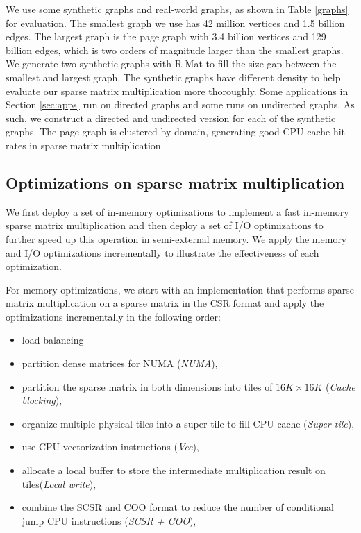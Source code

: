 We use some synthetic graphs and real-world graphs, as shown in Table \ref{graphs}
for evaluation. The smallest graph we use has 42 million vertices and 1.5 billion
edges. The largest graph is the page graph with 3.4 billion vertices
and 129 billion edges, which is two orders of magnitude larger than the smallest
graphs. We generate two synthetic graphs with R-Mat \cite{rmat} to fill
the size gap between the smallest and largest graph. The synthetic graphs
have different density to help evaluate our sparse matrix multiplication more
thoroughly. Some applications in Section \ref{sec:apps} run on directed graphs
and some runs on undirected graphs. As such, we construct a directed and
undirected version for each of the synthetic graphs. The page graph is clustered
by domain, generating good CPU cache hit rates in sparse matrix multiplication.

\subsection{Optimizations on sparse matrix multiplication}
We first deploy a set of in-memory optimizations to implement a fast
in-memory sparse matrix multiplication and then deploy a set of I/O
optimizations to further speed up this operation in semi-external memory.
We apply the memory and I/O optimizations incrementally to illustrate
the effectiveness of each optimization.

For memory optimizations, we start with an implementation that performs sparse
matrix multiplication on a sparse matrix in the CSR format and apply
the optimizations incrementally in the following order:
\begin{itemize} \itemsep1pt \parskip0pt 
	\item load balancing 
	\item partition dense matrices for NUMA (\textit{NUMA}),
	\item partition the sparse matrix in both dimensions into tiles of
		$16K \times 16K$ (\textit{Cache blocking}),
	\item organize multiple physical tiles into a super tile to fill CPU cache
		(\textit{Super tile}),
	\item use CPU vectorization instructions (\textit{Vec}),
	\item allocate a local buffer to store the intermediate multiplication
		result on tiles(\textit{Local write}),
	\item combine the SCSR and COO format to reduce the number of conditional
		jump CPU instructions (\textit{SCSR + COO}),
\end{itemize}


